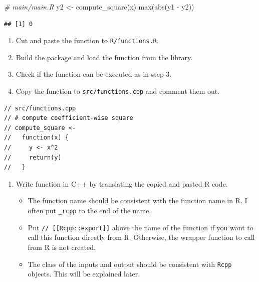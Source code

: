 \documentclass[
]{book}
\newenvironment{Shaded}{\begin{snugshade}}{\end{snugshade}}
\newcommand{\CommentTok}[1]{\textcolor[rgb]{0.56,0.35,0.01}{\textit{#1}}}
\newcommand{\FunctionTok}[1]{\textcolor[rgb]{0.00,0.00,0.00}{#1}}
\newcommand{\NormalTok}[1]{#1}
\newcommand{\OtherTok}[1]{\textcolor[rgb]{0.56,0.35,0.01}{#1}}
\newcommand{\SpecialCharTok}[1]{\textcolor[rgb]{0.00,0.00,0.00}{#1}}
\providecommand{\tightlist}{%
  \setlength{\itemsep}{0pt}\setlength{\parskip}{0pt}}
\begin{document}
\begin{Shaded}
\begin{Highlighting}[]
\CommentTok{\# main/main.R}
\NormalTok{y2 }\OtherTok{\textless{}{-}} \FunctionTok{compute\_square}\NormalTok{(x)}
\FunctionTok{max}\NormalTok{(}\FunctionTok{abs}\NormalTok{(y1 }\SpecialCharTok{{-}}\NormalTok{ y2))}
\end{Highlighting}
\end{Shaded}

\begin{verbatim}
## [1] 0
\end{verbatim}

\begin{enumerate}
\def\labelenumi{\arabic{enumi}.}
\setcounter{enumi}{3}
\tightlist
\item
  Cut and paste the function to \texttt{R/functions.R}.
\item
  Build the package and load the function from the library.
\item
  Check if the function can be executed as in step 3.
\item
  Copy the function to \texttt{src/functions.cpp} and comment them out.
\end{enumerate}

\begin{verbatim}
// src/functions.cpp
// # compute coefficient-wise square
// compute_square <-
//   function(x) {
//     y <- x^2
//     return(y)
//   }
\end{verbatim}

\begin{enumerate}
\def\labelenumi{\arabic{enumi}.}
\setcounter{enumi}{7}
\tightlist
\item
  Write function in C++ by translating the copied and pasted R code.

  \begin{itemize}
  \tightlist
  \item
    The function name should be consistent with the function name in R. I often put \texttt{\_rcpp} to the end of the name.
  \item
    Put \texttt{//\ {[}{[}Rcpp::export{]}{]}} above the name of the function if you want to call this function directly from R. Otherwise, the wrapper function to call from R is not created.
  \item
    The class of the inputs and output should be consistent with \texttt{Rcpp} objects. This will be explained later.
  \end{itemize}
\end{enumerate}
\end{document}

